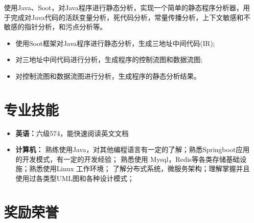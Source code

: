 \documentclass{resume}
\begin{document}

\Contents
{使用Java、Soot，对Java程序进行静态分析，实现一个简单的静态程序分析器，用于完成对Java代码的活跃变量分析，死代码分析，常量传播分析，上下文敏感和不敏感的指针分析，和污点分析等。}
{\begin{itemize}
    \item 使用Soot框架对Java程序进行静态分析，生成三地址中间代码(IR);
    \item 对三地址中间代码进行分析，生成程序的控制流图和数据流图;
    \item 对控制流图和数据流图进行分析，生成程序的静态分析结果。
\end{itemize} }
\sepspace

\section{专业技能}
\begin{itemize}
    \item \textbf{英语：}{六级574，能快速阅读英文文档}
    \item \textbf{计算机：}
    {熟练使用Java，对其他编程语言有一定的了解；熟悉Springboot应用的开发模式，有一定的开发经验；
    熟悉使用 Mysql，Redis等各类存储基础设施；熟悉使用Linux 工作环境；
    了解分布式系统，微服务架构；理解掌握并且使用过各类型UML图和各种设计模式；}
\end{itemize}
\sepspace

\section{奖励荣誉}
\end{document}
